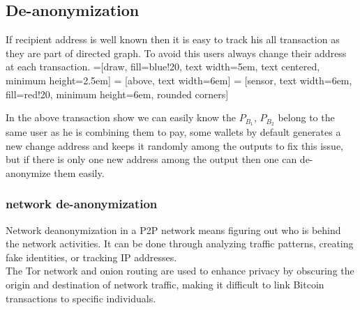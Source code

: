 \documentclass{article}
\begin{document}
\subsection{De-anonymization}
If recipient address is well known then it is easy to track his all transaction as they are part of directed graph. To avoid this users always change their address at each transaction.
=[draw, fill=blue!20, text width=5em, 
text centered, minimum height=2.5em]
 = [above, text width=6em]
 = [sensor, text width=6em, fill=red!20, 
minimum height=6em, rounded corners]
\def\blockdist{2.3}
\def\edgedist{1}
\begin{center}
\end{center}
In the above transaction show we can easily know the $P_{B_{1}}$, $P_{B_{2}}$ belong to the same user as he is combining them to pay, some wallets by default generates a new change address and keeps it randomly among the outputs to fix this issue, but if there is only one new address among the output then one can de-anonymize them easily. \\
\subsubsection{network de-anonymization}
Network deanonymization in a P2P network means figuring out who is behind the network activities. It can be done through analyzing traffic patterns, creating fake identities, or tracking IP addresses.\\
The Tor network and onion routing are used to enhance privacy by obscuring the origin and destination of network traffic, making it difficult to link Bitcoin transactions to specific individuals.
\end{document}
